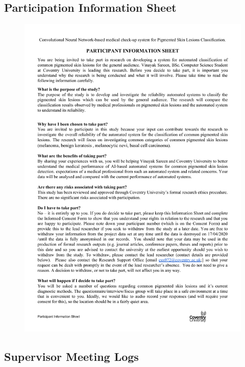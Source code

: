 \subsection*{Participation Information Sheet}
\begin{figure}[!htp]
    \centering
    \includegraphics[width=12cm]{Documents/participation.pdf}
\end{figure}
\pagebreak
\subsection*{Supervisor Meeting Logs}
